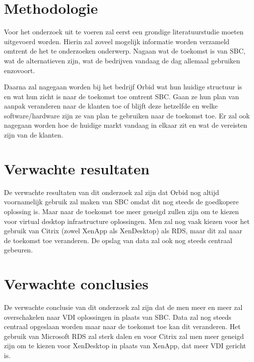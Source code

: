 \section{Methodologie}
\label{sec:methodologie}

Voor het onderzoek uit te voeren zal eerst een grondige literatuurstudie moeten uitgevoerd worden. Hierin zal zoveel mogelijk informatie worden verzameld omtrent de het te onderzoeken onderwerp. Nagaan wat de toekomst is van SBC, wat de alternatieven zijn, wat de bedrijven vandaag de dag allemaal gebruiken enzovoort.

Daarna zal nagegaan worden bij het bedrijf Orbid wat hun huidige structuur is en wat hun zicht is naar de toekomst toe omtrent SBC. Gaan ze hun plan van aanpak veranderen naar de klanten toe of blijft deze hetzelfde en welke software/hardware zijn ze van plan te gebruiken naar de toekomst toe. Er zal ook nagegaan worden hoe de huidige markt vandaag in elkaar zit en wat de vereisten zijn van de klanten.

\section{Verwachte resultaten}
\label{sec:verwachte_resultaten}

De verwachte resultaten van dit onderzoek zal zijn dat Orbid nog altijd voornamelijk gebruik zal maken van SBC omdat dit nog steeds de goedkopere oplossing is. Maar naar de toekomst toe meer geneigd zullen zijn om te kiezen voor virtual desktop infrastructure oplossingen. Men zal nog vaak kiezen voor het gebruik van Citrix (zowel XenApp als XenDesktop) als RDS, maar dit zal naar de toekomst toe veranderen. De opslag van data zal ook nog steeds centraal gebeuren.

\section{Verwachte conclusies}
\label{sec:verwachte_conclusies}

De verwachte conclusie van dit onderzoek zal zijn dat de men meer en meer zal overschakelen naar VDI oplossingen in plaats van SBC. Data zal nog steeds centraal opgeslaan worden maar naar de toekomst toe kan dit veranderen. Het gebruik van Microsoft RDS zal sterk dalen en voor Citrix zal men meer geneigd zijn om te kiezen voor XenDesktop in plaats van XenApp, dat meer VDI gericht is.

